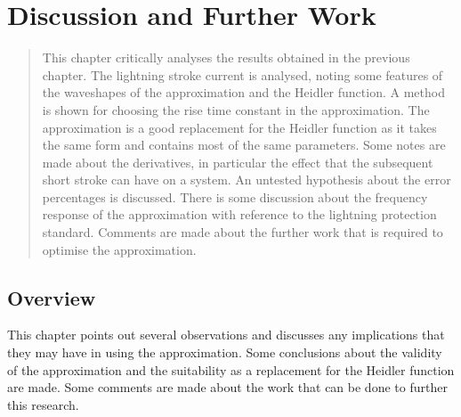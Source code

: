 
\chapter{Discussion and Further Work} %

\label{ChapterDiscussion} %


\begin{quote}
This chapter critically analyses the results obtained in the previous chapter. The lightning stroke current is analysed, noting some features of the waveshapes of the approximation and the Heidler function. A method is shown for choosing the rise time constant in the approximation. The approximation is a good replacement for the Heidler function as it takes the same form and contains most of the same parameters. Some notes are made about the derivatives, in particular the effect that the subsequent short stroke can have on a system. An untested hypothesis about the error percentages is discussed. There is some discussion about the frequency response of the approximation with reference to the lightning protection standard. Comments are made about the further work that is required to optimise the approximation.
\end{quote}


\section{Overview}
\label{sec:discussion_overview}
This chapter points out several observations and discusses any implications that they may have in using the approximation. Some conclusions about the validity of the approximation and the suitability as a replacement for the Heidler function are made. Some comments are made about the work that can be done to further this research.


